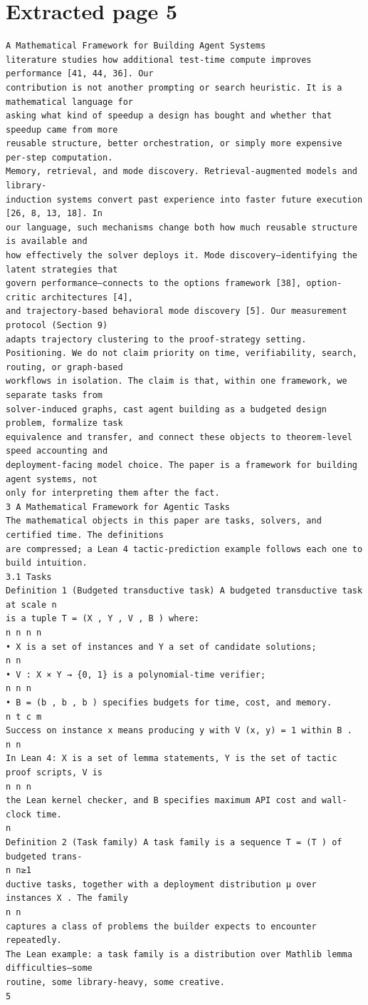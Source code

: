 \documentclass[11pt]{article}
\begin{document}
\section*{Extracted page 5}
\begin{verbatim}
A Mathematical Framework for Building Agent Systems
literature studies how additional test-time compute improves performance [41, 44, 36]. Our
contribution is not another prompting or search heuristic. It is a mathematical language for
asking what kind of speedup a design has bought and whether that speedup came from more
reusable structure, better orchestration, or simply more expensive per-step computation.
Memory, retrieval, and mode discovery. Retrieval-augmented models and library-
induction systems convert past experience into faster future execution [26, 8, 13, 18]. In
our language, such mechanisms change both how much reusable structure is available and
how effectively the solver deploys it. Mode discovery—identifying the latent strategies that
govern performance—connects to the options framework [38], option-critic architectures [4],
and trajectory-based behavioral mode discovery [5]. Our measurement protocol (Section 9)
adapts trajectory clustering to the proof-strategy setting.
Positioning. We do not claim priority on time, verifiability, search, routing, or graph-based
workflows in isolation. The claim is that, within one framework, we separate tasks from
solver-induced graphs, cast agent building as a budgeted design problem, formalize task
equivalence and transfer, and connect these objects to theorem-level speed accounting and
deployment-facing model choice. The paper is a framework for building agent systems, not
only for interpreting them after the fact.
3 A Mathematical Framework for Agentic Tasks
The mathematical objects in this paper are tasks, solvers, and certified time. The definitions
are compressed; a Lean 4 tactic-prediction example follows each one to build intuition.
3.1 Tasks
Definition 1 (Budgeted transductive task) A budgeted transductive task at scale n
is a tuple T = (X , Y , V , B ) where:
n n n n
• X is a set of instances and Y a set of candidate solutions;
n n
• V : X × Y → {0, 1} is a polynomial-time verifier;
n n n
• B = (b , b , b ) specifies budgets for time, cost, and memory.
n t c m
Success on instance x means producing y with V (x, y) = 1 within B .
n n
In Lean 4: X is a set of lemma statements, Y is the set of tactic proof scripts, V is
n n n
the Lean kernel checker, and B specifies maximum API cost and wall-clock time.
n
Definition 2 (Task family) A task family is a sequence T = (T ) of budgeted trans-
n n≥1
ductive tasks, together with a deployment distribution µ over instances X . The family
n n
captures a class of problems the builder expects to encounter repeatedly.
The Lean example: a task family is a distribution over Mathlib lemma difficulties—some
routine, some library-heavy, some creative.
5
\end{verbatim}
\end{document}
